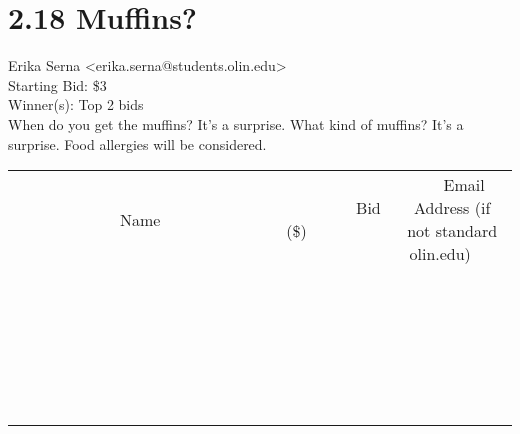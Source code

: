 \documentclass[11pt]{article}
\begin{document}
					\section*{2.18 Muffins?}
					Erika Serna <erika.serna@students.olin.edu> \\
					Starting Bid: \$3 \\
					Winner(s): Top 2 bids \\
					When do you get the muffins? It's a surprise. What kind of muffins? It's a surprise. Food allergies will be considered. \\
					[6ex]
					\begin{tabular}{c c c}
						~~~~~~~~~~~~~Name~~~~~~~~~~~~~ & ~~~~~~~~~Bid (\$)~~~~~~~~~ & ~~~Email Address (if not standard olin.edu)~~~ \\
				
 & & \\
\hline
 & & \\
\hline
 & & \\
\hline
 & & \\
\hline
 & & \\
\hline
 & & \\
\hline
 & & \\
\hline
 & & \\
\hline
 & & \\
\hline
 & & \\
\hline
 & & \\
\hline
 & & \\
\hline
 & & \\
\hline
 & & \\
\hline
 & & \\
\hline
 & & \\
\hline
 & & \\
\hline
 & & \\
\hline
 & & \\
\hline
 & & \\
\hline
 & & \\
\hline
 & & \\
\hline
 & & \\
\hline
 & & \\
\hline
 & & \\
\hline
 & & \\
\hline
					\end{tabular}
					\clearpage
				
\end{document}
